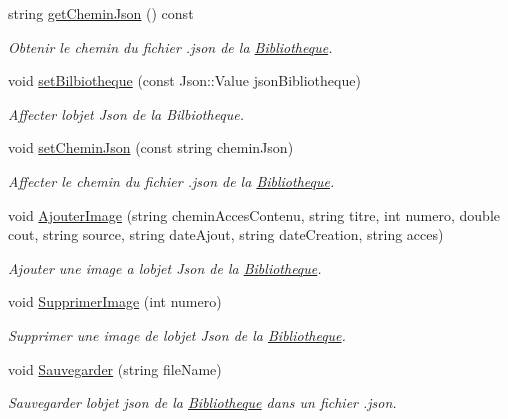 \begin{DoxyCompactItemize}
string \hyperlink{classBibliotheque_ace0c63ec27d7adfb7146406769f1a051}{get\+Chemin\+Json} () const
\begin{DoxyCompactList}\small\item\em Obtenir le chemin du fichier .json de la \hyperlink{classBibliotheque}{Bibliotheque}. \end{DoxyCompactList}\item 
void \hyperlink{classBibliotheque_a8dc396d28693e921f7fd849944356434}{set\+Bilbiotheque} (const Json\+::\+Value json\+Bibliotheque)
\begin{DoxyCompactList}\small\item\em Affecter l\textquotesingle{}objet Json de la Bilbiotheque. \end{DoxyCompactList}\item 
void \hyperlink{classBibliotheque_ac9201ed432b00fc3cd2621db1c8df78b}{set\+Chemin\+Json} (const string chemin\+Json)
\begin{DoxyCompactList}\small\item\em Affecter le chemin du fichier .json de la \hyperlink{classBibliotheque}{Bibliotheque}. \end{DoxyCompactList}\item 
void \hyperlink{classBibliotheque_a246e3a8893bb28b0d76845c624a1cd48}{Ajouter\+Image} (string chemin\+Acces\+Contenu, string titre, int numero, double cout, string source, string date\+Ajout, string date\+Creation, string acces)
\begin{DoxyCompactList}\small\item\em Ajouter une image a l\textquotesingle{}objet Json de la \hyperlink{classBibliotheque}{Bibliotheque}. \end{DoxyCompactList}\item 
void \hyperlink{classBibliotheque_a3e4940fd008650236beae91780d7b068}{Supprimer\+Image} (int numero)
\begin{DoxyCompactList}\small\item\em Supprimer une image de l\textquotesingle{}objet Json de la \hyperlink{classBibliotheque}{Bibliotheque}. \end{DoxyCompactList}\item 
void \hyperlink{classBibliotheque_abaf79da5c656d7cccb14b3c3a4b542f6}{Sauvegarder} (string file\+Name)
\begin{DoxyCompactList}\small\item\em Sauvegarder l\textquotesingle{}objet json de la \hyperlink{classBibliotheque}{Bibliotheque} dans un fichier .json. \end{DoxyCompactList}\item 

\end{DoxyCompactItemize}
